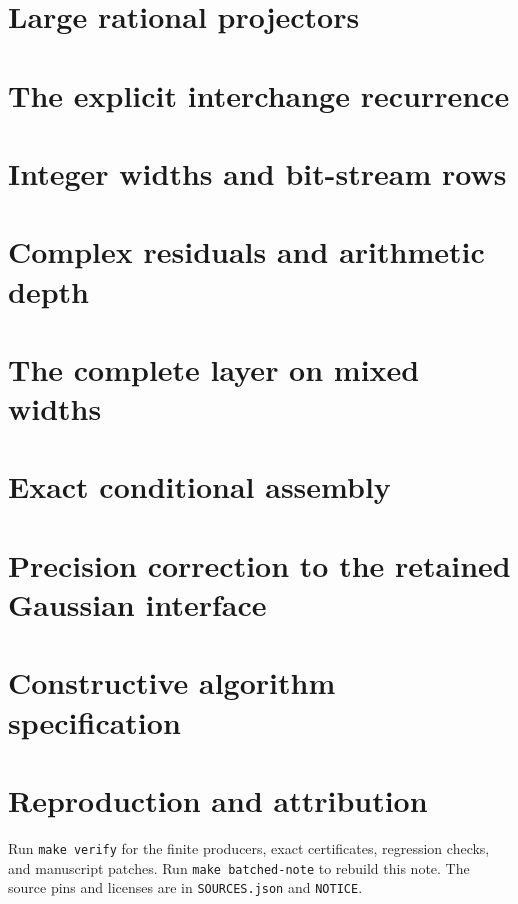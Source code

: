 \documentclass[11pt]{article}
\numberwithin{equation}{section}
\begin{document}
\section{Large rational projectors}


\section{The explicit interchange recurrence}



\section{Integer widths and bit-stream rows}


\section{Complex residuals and arithmetic depth}



\section{The complete layer on mixed widths}


\section{Exact conditional assembly}


\section{Precision correction to the retained Gaussian interface}


\section{Constructive algorithm specification}


\section{Reproduction and attribution}
Run \texttt{make verify} for the finite producers, exact certificates,
regression checks, and manuscript patches. Run \texttt{make batched-note}
to rebuild this note. The source pins and licenses are in
\texttt{SOURCES.json} and \texttt{NOTICE}.
\end{document}
